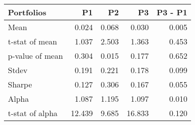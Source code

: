 \begin{tabular}{lrrrr}
\toprule
Portfolios & P1 & P2 & P3 & P3 - P1 \\
\midrule
Mean & 0.024 & 0.068 & 0.030 & 0.005 \\
t-stat of mean & 1.037 & 2.503 & 1.363 & 0.453 \\
p-value of mean & 0.304 & 0.015 & 0.177 & 0.652 \\
Stdev & 0.191 & 0.221 & 0.178 & 0.099 \\
Sharpe & 0.127 & 0.306 & 0.167 & 0.055 \\
Alpha & 1.087 & 1.195 & 1.097 & 0.010 \\
t-stat of alpha & 12.439 & 9.685 & 16.833 & 0.120 \\
\bottomrule
\end{tabular}
